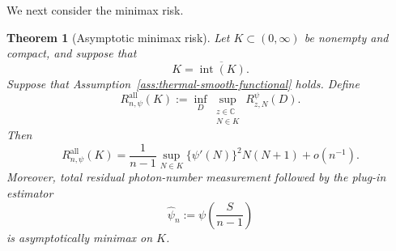 \documentclass{article}
\newtheorem{theorem}{Theorem}[section]
\theoremstyle{named}
\theoremstyle{named1}
\newcommand{\N}{\mathbb{N}}
\newcommand{\bbC}{\mathbb C}
\theoremstyle{plain}
\theoremstyle{remark}
\begin{document}
We next consider the minimax risk.

\begin{theorem}[Asymptotic minimax risk]
\label{thm:thermal-global-minimax-risk}
Let \(K\subset(0,\infty)\) be nonempty and compact, and suppose that
\begin{equation}
    K=\overline{\operatorname{int}(K)}.
    \label{eq:thermal-regular-compact-set}
\end{equation}
Suppose that Assumption~\ref{ass:thermal-smooth-functional} holds. Define
\begin{equation}
    R_{n,\psi}^{\mathrm{all}}(K)
    :=
    \inf_D
    \sup_{\substack{z\in\bbC\\N\in K}}
        R_{z,N}^{\psi}(D).
    \label{eq:thermal-global-minimax-risk-definition}
\end{equation}
Then
\begin{equation}
    R_{n,\psi}^{\mathrm{all}}(K)
    =
    \frac{1}{n-1}
    \sup_{N\in K}
    \{\psi'(N)\}^2N(N+1)
    +
    o(n^{-1}).
    \label{eq:thermal-global-minimax-risk}
\end{equation}
Moreover, total residual photon-number measurement followed by the
plug-in estimator
\begin{equation}
    \widehat\psi_n
    :=
    \psi\!\left(\frac{S}{n-1}\right)
    \label{eq:thermal-asymptotically-minimax-estimator}
\end{equation}
is asymptotically minimax on \(K\).
\end{theorem}
\end{document}
